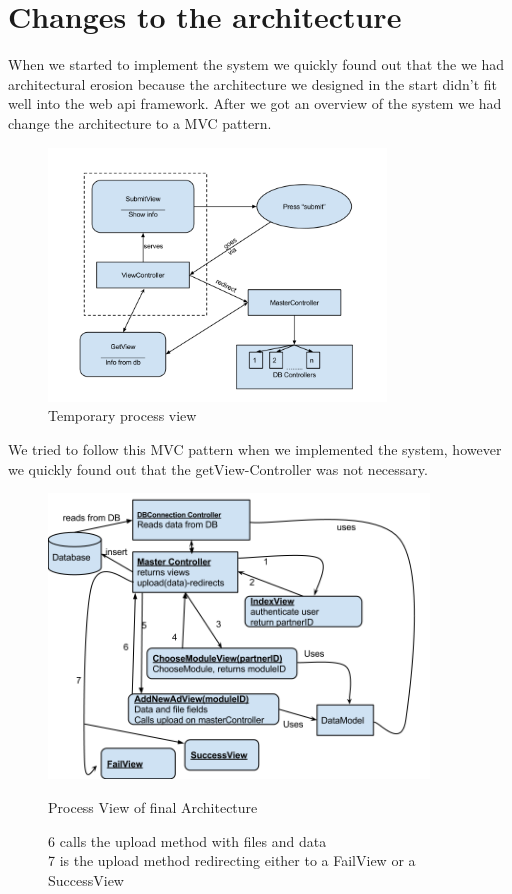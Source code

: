 \section{Changes to the architecture}
When we started to implement the system we quickly found out that the we had architectural erosion because the architecture we designed in the start didn't fit well into the web api framework. After we got an overview of the system we had change the architecture to a MVC pattern. 
\begin{figure}[H]
\centering
\includegraphics[width=0.8\textwidth]{images/architecture03_revised1.png}
\caption{Temporary process view}
\label{fig:info_flow}
\end{figure}
We tried to follow this MVC pattern when we implemented the system, however we quickly found out that the getView-Controller was not necessary.
\begin{center}
\begin{figure}[H]
\centering
\includegraphics[width=0.9\textwidth]{images/architecture_final01.png}
\caption{Process View of final Architecture}
\caption*{6 calls the upload method with files and data\\
7 is the upload method redirecting either to a FailView or a SuccessView}
\label{fig:process_view}
\end{figure}
\end{center}

